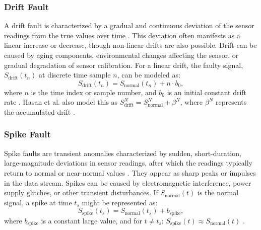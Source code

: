 \subsubsection{Drift Fault}
A drift fault is characterized by a gradual and continuous deviation of the sensor readings from the true values over time \cite{Saeed2021, Hasan2024}. This deviation often manifests as a linear increase or decrease, though non-linear drifts are also possible. Drift can be caused by aging components, environmental changes affecting the sensor, or gradual degradation of sensor calibration. For a linear drift, the faulty signal, \(S_\text{drift}(t_n)\) at discrete time sample \(n\), can be modeled as:
\begin{equation}
S_\text{drift}(t_n) = S_\text{normal}(t_n) + n \cdot b_0,
\label{eq:drift}
\end{equation}
where \(n\) is the time index or sample number, and \(b_0\) is an initial constant drift rate \cite{Saeed2021}. Hasan et al. also model this as \(S_\text{drift}^N = S_\text{normal}^N +\beta^N\), where \(\beta^N\) represents the accumulated drift \cite{Hasan2024}.

\subsubsection{Spike Fault}
Spike faults are transient anomalies characterized by sudden, short-duration, large-magnitude deviations in sensor readings, after which the readings typically return to normal or near-normal values \cite{Saeed2021, Shi2024}. They appear as sharp peaks or impulses in the data stream. Spikes can be caused by electromagnetic interference, power supply glitches, or other transient disturbances. If \(S_\text{normal}(t)\) is the normal signal, a spike at time \(t_s\) might be represented as:
\begin{equation}
S_\text{spike}(t_s) = S_\text{normal}(t_s) + b_\text{spike},
\label{eq:spike}
\end{equation}
where \(b_\text{spike}\) is a constant large value, and for \(t \neq t_s\): \(S_\text{spike}(t) \approx S_\text{normal}(t)\) \cite{Saeed2021, Shi2024}.

